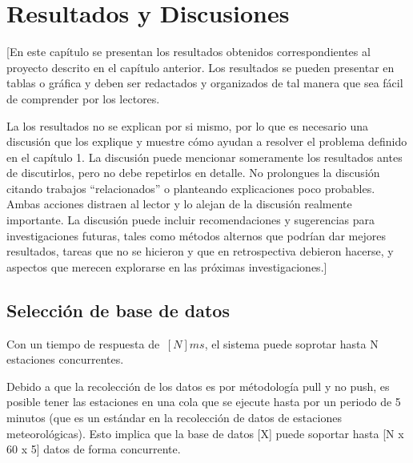\chapter{Resultados y Discusiones}
[En este capítulo se presentan los resultados obtenidos correspondientes al proyecto descrito en el capítulo anterior. Los resultados se pueden presentar en tablas o gráfica y deben ser redactados y organizados de tal manera que sea fácil de comprender por los lectores.

La los resultados no se explican por si mismo, por lo que es necesario una discusión que los explique y muestre cómo ayudan a resolver el problema definido en el capítulo 1. La discusión puede mencionar someramente los resultados antes de discutirlos, pero no debe repetirlos en detalle. No prolongues la discusión citando trabajos ``relacionados'' o planteando explicaciones poco probables. Ambas acciones distraen al lector y lo alejan de la discusión realmente importante. La discusión puede incluir recomendaciones y sugerencias para investigaciones futuras, tales como métodos alternos que podrían dar mejores resultados, tareas que no se hicieron y que en retrospectiva debieron hacerse, y aspectos que merecen explorarse en las próximas investigaciones.]


\section{Selección de base de datos}





Con un tiempo de respuesta de $~[N]ms$, el sistema puede soprotar hasta N estaciones concurrentes.

Debido a que la recolección de los datos es por métodología pull y no push, es posible tener las estaciones en una cola que se ejecute hasta por un periodo de 5 minutos (que es un estándar en la recolección de datos de estaciones meteorológicas). Esto implica que la base de datos [X] puede soportar hasta [N x 60 x 5] datos de forma concurrente.

